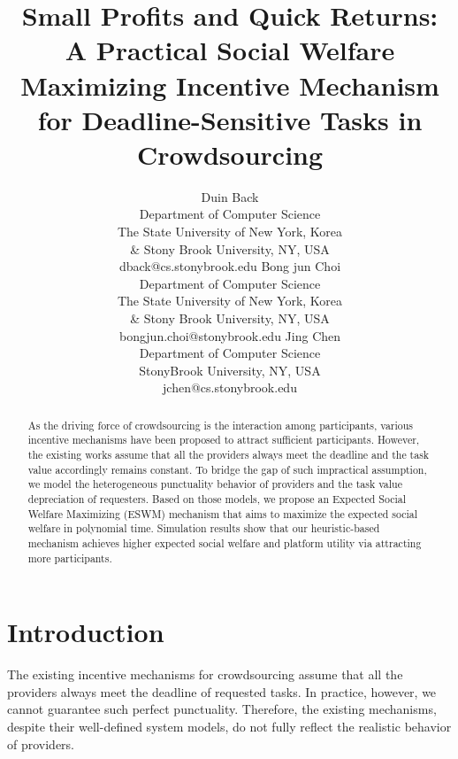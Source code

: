\documentclass[letterpaper]{article} %
\begin{document}
	
	\title{Small Profits and Quick Returns: A Practical Social Welfare Maximizing Incentive Mechanism for Deadline-Sensitive Tasks in Crowdsourcing}
	\author{Duin Back\\
		Department of Computer Science\\
		\small The State University of New York, Korea\\
		\& Stony Brook University, NY, USA\\
		dback@cs.stonybrook.edu \And
		Bong jun Choi\\
		Department of Computer Science\\
		\small The State University of New York, Korea\\
		\& Stony Brook University, NY, USA\\
		bongjun.choi@stonybrook.edu \And
		Jing Chen\\
		Department of Computer Science\\
		StonyBrook University, NY, USA\\
		jchen@cs.stonybrook.edu
	}
	\maketitle
	\begin{abstract}
		As the driving force of crowdsourcing is the interaction among participants, various incentive mechanisms have been proposed to attract sufficient participants. However, the existing works assume that all the providers always meet the deadline and the task value accordingly remains constant. To bridge the gap of such impractical assumption, we model the heterogeneous punctuality behavior of providers and the task value depreciation of requesters. Based on those models, we propose an Expected Social Welfare Maximizing (ESWM) mechanism that aims to maximize the expected social welfare in polynomial time. Simulation results show that our heuristic-based mechanism achieves higher expected social welfare and platform utility via attracting more participants. 
	\end{abstract}
	
\section{Introduction}
	\noindent The existing incentive mechanisms for crowdsourcing assume that all the providers always meet the deadline of requested tasks. In practice, however, we cannot guarantee such perfect punctuality. Therefore, the existing mechanisms, despite their well-defined system models, do not fully reflect the realistic behavior of providers.
	 
\end{document}
